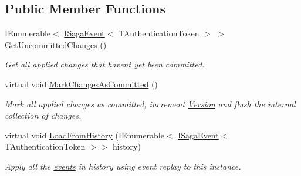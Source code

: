 \subsection*{Public Member Functions}
\begin{DoxyCompactItemize}
\item 
I\+Enumerable$<$ \hyperlink{interfaceCqrs_1_1Events_1_1ISagaEvent}{I\+Saga\+Event}$<$ T\+Authentication\+Token $>$ $>$ \hyperlink{classCqrs_1_1Akka_1_1Domain_1_1AkkaSaga_ac88061e29e3e2223db31ce9075835b46_ac88061e29e3e2223db31ce9075835b46}{Get\+Uncommitted\+Changes} ()
\begin{DoxyCompactList}\small\item\em Get all applied changes that haven\textquotesingle{}t yet been committed. \end{DoxyCompactList}\item 
virtual void \hyperlink{classCqrs_1_1Akka_1_1Domain_1_1AkkaSaga_a83269fac4653cca097461e924feaea7f_a83269fac4653cca097461e924feaea7f}{Mark\+Changes\+As\+Committed} ()
\begin{DoxyCompactList}\small\item\em Mark all applied changes as committed, increment \hyperlink{classCqrs_1_1Akka_1_1Domain_1_1AkkaSaga_a3fda31a3857e12a1aed60f4a4f04edd1_a3fda31a3857e12a1aed60f4a4f04edd1}{Version} and flush the internal collection of changes. \end{DoxyCompactList}\item 
virtual void \hyperlink{classCqrs_1_1Akka_1_1Domain_1_1AkkaSaga_a40b859bc15c2f7c87a21b07f9bc9548c_a40b859bc15c2f7c87a21b07f9bc9548c}{Load\+From\+History} (I\+Enumerable$<$ \hyperlink{interfaceCqrs_1_1Events_1_1ISagaEvent}{I\+Saga\+Event}$<$ T\+Authentication\+Token $>$$>$ history)
\begin{DoxyCompactList}\small\item\em Apply all the \hyperlink{}{events} in {\itshape history}  using event replay to this instance. \end{DoxyCompactList}\end{DoxyCompactItemize}
